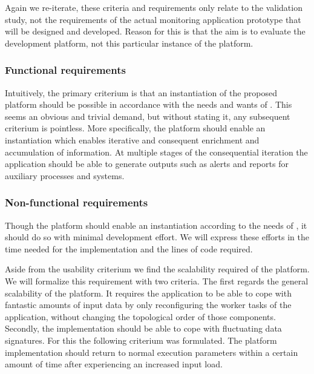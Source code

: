 Again we re-iterate, these criteria and requirements only relate to the validation study, not the requirements of the actual monitoring application prototype that will be designed and developed. Reason for this is that the aim is to evaluate the development platform, not this particular instance of the platform.

\subsubsection*{Functional requirements}
Intuitively, the primary criterium is that an instantiation of the proposed platform should be possible in accordance with the needs and wants of \idsystems . This seems an obvious and trivial demand, but without stating it, any subsequent criterium is pointless. More specifically, the platform should enable an instantiation which enables iterative and consequent enrichment and accumulation of information. At multiple stages of the consequential iteration the application should be able to generate outputs such as alerts and reports for auxiliary processes and systems. 

\subsubsection*{Non-functional requirements} Though the platform should enable an instantiation according to the needs of \idsystems, it should do so with minimal development effort. We will express these efforts in the time needed for the implementation and the lines of code required.

Aside from the usability criterium we find the scalability required of the platform. We will formalize this requirement with two criteria. The first regards the general scalability of the platform. It requires the application to be able to cope with fantastic amounts of input data by only reconfiguring the worker tasks of the application, without changing the topological order of those components. Secondly, the implementation should be able to cope with fluctuating data signatures. For this the following criterium was formulated. The platform implementation should return to normal execution parameters within a certain amount of time after experiencing an increased input load.

